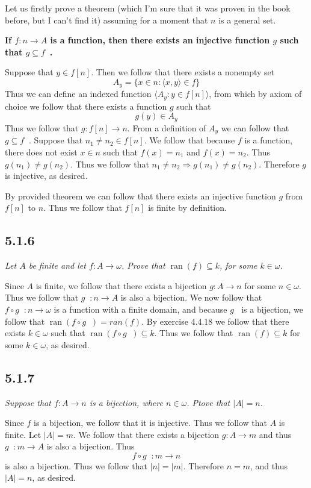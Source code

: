 \documentclass[11pt,oneside,titlepage]{book}
\DeclareMathOperator \inv {^{-1}}
\DeclareMathOperator \ra {\Rightarrow}
\DeclareMathOperator \ran {ran}
\newcommand{\eangle}[1]{\langle #1 \rangle}
\begin{document}
Let us firstly prove a theorem (which I'm sure that it was proven in the book before,
but I can't find it) assuming for a moment that $n$ is a general set.

\textbf{If $f: n \to A$ is a function, then there exists an injective function $g$
such that $g \subseteq f\inv$.}

Suppose that $y \in f[n]$. Then we follow that there exists a nonempty set
$$A_y = \{x \in n : \eangle{x, y} \in f\}$$
Thus we can define an indexed function $\eangle{A_y: y \in f[n]}$, from which by axiom of
choice we follow that there exists a function $g$ such that 
$$g(y) \in A_y$$
Thus we follow that $g: f[n] \to n$. From a definition of $A_y$ we can follow that
$g \subseteq f\inv$. Suppose that $n_1 \neq n_2 \in f[n]$. We follow that because $f$ is a
function, there does not exist $x \in n$ such that $f(x) = n_1$ and $f(x) = n_2$. Thus
$g(n_1) \neq g(n_2)$.
Thus we follow that $n_1 \neq n_2 \ra g(n_1) \neq g(n_2)$. Therefore $g$ is injective, as desired.

By provided theorem we can follow that there exists an injective function $g$ from $f[n]$ to $n$.
Thus we follow that $f[n]$ is finite by definition.

\subsection*{5.1.6}

\textit{Let $A$ be finite and let $f: A \to \omega$. Prove that $\ran(f) \subseteq k$, for
  some $k \in \omega$.}


Since $A$ is finite, we follow that there exists a bijection $g: A \to n$
for some $n \in \omega$. Thus we follow that $g \inv: n \to A$ is also a bijection.
We now follow that $f \circ g\inv: n \to \omega $ is a function with a finite domain, and
because $g\inv$ is a bijection, we follow that $\ran(f \circ g\inv) = ran(f)$.
By exercise 4.4.18 we follow that there exists $k \in \omega$ such that
$\ran(f \circ g\inv) \subseteq k$. Thus we follow that $\ran(f) \subseteq k$ for some
$k \in \omega$, as desired.

\subsection*{5.1.7}

\textit{Suppose that $f: A \to n$ is a bijection, where $n \in \omega$. Ptove that $|A| = n$.}

Since $f$ is a bijection, we follow that it is injective. Thus we follow that $A$ is finite.
Let $|A| = m$. We follow that there exists a bijection $g: A \to m$ and thus $g \inv: m \to A$
is also a bijection. Thus
$$f \circ g \inv: m \to n$$
is also a bijection. Thus we follow that $|n| = |m|$. Therefore $n = m$, and thus $|A| = n$,
as desired.
\end{document}
